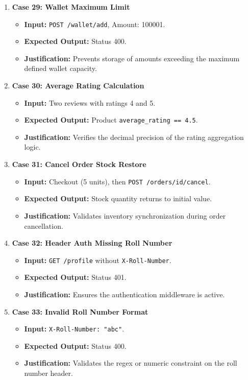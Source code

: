 \documentclass{article}
\begin{document}
\begin{enumerate}
    \item \textbf{Case 29: Wallet Maximum Limit}
    \begin{itemize}
        \item \textbf{Input:} \texttt{POST /wallet/add}, Amount: 100001.
        \item \textbf{Expected Output:} Status 400.
        \item \textbf{Justification:} Prevents storage of amounts exceeding the maximum defined wallet capacity.
    \end{itemize}

    \item \textbf{Case 30: Average Rating Calculation}
    \begin{itemize}
        \item \textbf{Input:} Two reviews with ratings 4 and 5.
        \item \textbf{Expected Output:} Product \texttt{average_rating == 4.5}.
        \item \textbf{Justification:} Verifies the decimal precision of the rating aggregation logic.
    \end{itemize}

    \item \textbf{Case 31: Cancel Order Stock Restore}
    \begin{itemize}
        \item \textbf{Input:} Checkout (5 units), then \texttt{POST /orders/id/cancel}.
        \item \textbf{Expected Output:} Stock quantity returns to initial value.
        \item \textbf{Justification:} Validates inventory synchronization during order cancellation.
    \end{itemize}

    \item \textbf{Case 32: Header Auth Missing Roll Number}
    \begin{itemize}
        \item \textbf{Input:} \texttt{GET /profile} without \texttt{X-Roll-Number}.
        \item \textbf{Expected Output:} Status 401.
        \item \textbf{Justification:} Ensures the authentication middleware is active.
    \end{itemize}

    \item \textbf{Case 33: Invalid Roll Number Format}
    \begin{itemize}
        \item \textbf{Input:} \texttt{X-Roll-Number: "abc"}.
        \item \textbf{Expected Output:} Status 400.
        \item \textbf{Justification:} Validates the regex or numeric constraint on the roll number header.
    \end{itemize}


\end{enumerate}
\end{document}
